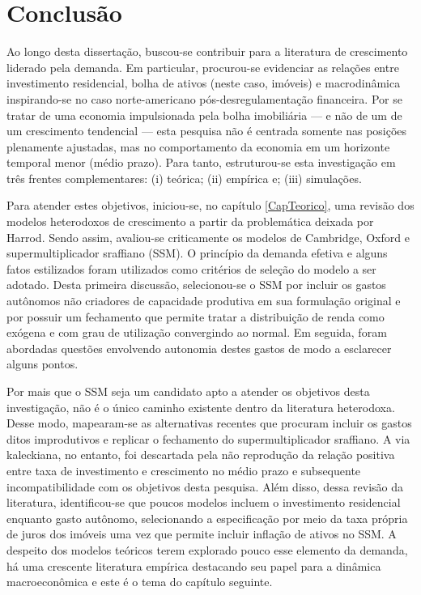 \chapter{Conclusão}

Ao longo desta dissertação, buscou-se contribuir para a literatura de crescimento liderado pela demanda.
Em particular, procurou-se evidenciar as relações entre investimento residencial, bolha de ativos (neste caso, imóveis) e macrodinâmica inspirando-se no caso norte-americano pós-desregulamentação financeira.
Por se tratar de uma economia impulsionada pela bolha imobiliária --- e não de um de um crescimento tendencial --- esta pesquisa não é centrada somente nas posições plenamente ajustadas, mas no comportamento da economia em um horizonte temporal menor (médio prazo).
Para tanto, estruturou-se esta investigação em três frentes complementares: (i) teórica; (ii) empírica e; (iii) simulações.



Para atender estes objetivos, iniciou-se, no capítulo \ref{CapTeorico}, uma revisão dos modelos heterodoxos de crescimento a partir da problemática deixada por Harrod.
Sendo assim, avaliou-se criticamente os modelos de Cambridge, Oxford e supermultiplicador sraffiano (SSM).
O princípio da demanda efetiva e alguns fatos estilizados foram utilizados como critérios de seleção do modelo a ser adotado.
Desta primeira discussão, selecionou-se o SSM por incluir os gastos autônomos não criadores de capacidade produtiva em sua formulação original e por possuir um fechamento que permite tratar a distribuição de renda como exógena e com grau de utilização convergindo ao normal.
Em seguida, foram abordadas questões envolvendo autonomia destes gastos de modo a esclarecer alguns pontos.

Por mais que o SSM seja um candidato apto a atender os objetivos desta investigação, não é o único caminho existente dentro da literatura heterodoxa.
Desse modo, mapearam-se as alternativas recentes que procuram incluir os gastos ditos improdutivos e replicar o fechamento do supermultiplicador sraffiano.
A via kaleckiana, no entanto, foi descartada pela não reprodução da relação positiva entre taxa de investimento e crescimento no médio prazo e subsequente incompatibilidade com os objetivos desta pesquisa.
Além disso, dessa revisão da literatura, identificou-se que poucos modelos incluem o investimento residencial enquanto gasto autônomo, selecionando a especificação por meio  da taxa própria de juros dos imóveis uma vez que permite incluir inflação de ativos no  SSM.
A despeito dos modelos teóricos terem explorado pouco
esse elemento da demanda, há uma crescente literatura empírica destacando seu papel para a dinâmica macroeconômica e este é o tema do capítulo seguinte.



